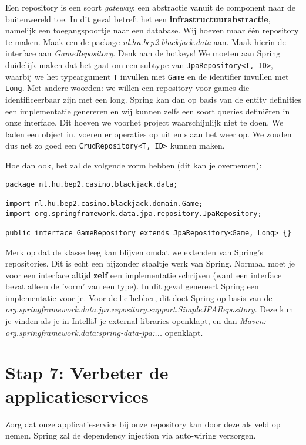 Een repository is een soort \textit{gateway}: een abstractie vanuit de component naar de buitenwereld toe.
In dit geval betreft het een \textbf{infrastructuurabstractie}, namelijk een toegangspoortje naar een database.
Wij hoeven maar één repository te maken. Maak een de package \textit{nl.hu.bep2.blackjack.data} aan.
Maak hierin de interface aan \textit{GameRepository}. Denk aan de hotkeys!
We moeten aan Spring duidelijk maken dat het gaat om een subtype van \texttt{JpaRepository<T, ID>},
waarbij we het typeargument \texttt{T} invullen met \texttt{Game} en de identifier invullen met \texttt{Long}.
Met andere woorden: we willen een repository voor games die identificeerbaar zijn met een long.
Spring kan dan op basis van de entity definities een implementatie genereren en wij kunnen zelfs 
een soort queries definiëren in onze interface. 
Dit hoeven we voorhet project waarschijnlijk niet te doen.
We laden een object in, voeren er operaties op uit en slaan het weer op. 
We zouden dus net zo goed een \texttt{CrudRepository<T, ID>}
kunnen maken. 

Hoe dan ook, het zal de volgende vorm hebben 
(dit kan je overnemen):
\begin{verbatim}
package nl.hu.bep2.casino.blackjack.data;

import nl.hu.bep2.casino.blackjack.domain.Game;
import org.springframework.data.jpa.repository.JpaRepository;

public interface GameRepository extends JpaRepository<Game, Long> {}
\end{verbatim}

Merk op dat de klasse leeg kan blijven omdat we extenden van Spring's repositories. Dit is echt een 
bijzonder staaltje werk van Spring. Normaal moet je voor een interface altijd \textbf{zelf} een 
implementatie schrijven (want een interface bevat alleen de 'vorm' van een type). In dit geval
genereert Spring een implementatie voor je. Voor de liefhebber, dit doet Spring op basis van de 
\textit{org.springframework.data.jpa.repository.support.SimpleJPARepository}. Deze kun je vinden 
als je in IntelliJ je external libraries openklapt, en dan \textit{Maven: org.springframework.data:spring-data-jpa:...}
openklapt.

\section{Stap 7: Verbeter de applicatieservices}
Zorg dat onze applicatieservice bij onze repository kan door 
deze als veld op nemen. Spring zal de dependency injection via 
auto-wiring verzorgen.

